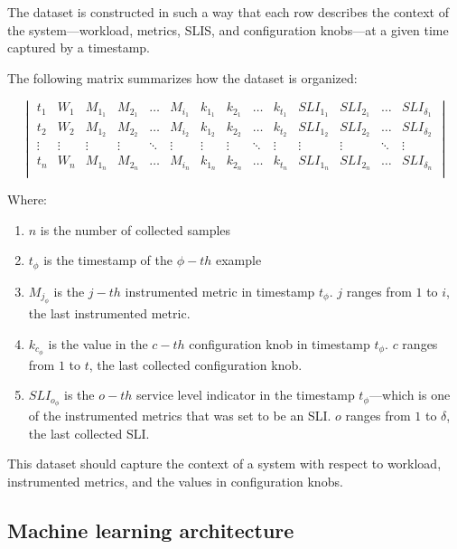 The dataset is constructed in such a way that each row describes the context of the system---workload, metrics, SLIS, and configuration knobs---at a given time captured by a timestamp.

The following matrix summarizes how the dataset is organized:

\setlength{\arraycolsep}{1pt}
\renewcommand\arraystretch{1.0}
\setcounter{MaxMatrixCols}{20}
$$
\begin{vmatrix}
  t_1 & W_1 & M_{1_1} & M_{2_1} & \dots & M_{i_1} & k_{1_1} & k_{2_1} & \dots & k_{t_1} & SLI_{1_1} & SLI_{2_1} & \dots & SLI_{\delta_1}\\
  t_2 & W_2 & M_{1_2} & M_{2_2} & \dots & M_{i_2} & k_{1_2} & k_{2_2} & \dots & k_{t_2} & SLI_{1_2} & SLI_{2_2} & \dots & SLI_{\delta_2}\\
  \vdots & \vdots & \vdots & \vdots & \ddots & \vdots & \vdots & \vdots & \ddots & \vdots & \vdots & \vdots & \ddots & \vdots \\
  t_n & W_n & M_{1_n} & M_{2_n} & \dots & M_{i_n} & k_{1_n} & k_{2_n} & \dots & k_{t_n} & SLI_{1_n} & SLI_{2_n} & \dots & SLI_{\delta_n}\\
\end{vmatrix}
$$

Where:

\begin{enumerate}
  \item $n$ is the number of collected samples
  \item $t_{\phi}$ is the timestamp of the $\phi-th$ example
  \item $M_{j_\phi}$ is the $j-th$ instrumented metric in timestamp $t_{\phi}$. $j$ ranges from $1$ to $i$, the last instrumented metric.
  \item $k_{c_\phi}$ is the value in the $c-th$ configuration knob in timestamp $t_{\phi}$. $c$ ranges from $1$ to $t$, the last collected configuration knob.
  \item $SLI_{o_\phi}$ is the $o-th$ service level indicator in the timestamp $t_{\phi}$---which is one of the instrumented metrics that was set to be an SLI. $o$ ranges from $1$ to $\delta$, the last collected SLI.
\end{enumerate}

This dataset should capture the context of a system with respect to workload, instrumented metrics, and the values in configuration knobs.  

\subsection{Machine learning architecture}

